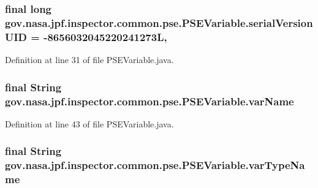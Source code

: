 \subsubsection[{\texorpdfstring{serial\+Version\+U\+ID}{serialVersionUID}}]{\setlength{\rightskip}{0pt plus 5cm}final long gov.\+nasa.\+jpf.\+inspector.\+common.\+pse.\+P\+S\+E\+Variable.\+serial\+Version\+U\+ID = -\/8656032045220241273L\hspace{0.3cm}{\ttfamily [static]}, {\ttfamily [private]}}\hypertarget{classgov_1_1nasa_1_1jpf_1_1inspector_1_1common_1_1pse_1_1_p_s_e_variable_ad11aee75ecf196e7e13bf14e3f9287d4}{}\label{classgov_1_1nasa_1_1jpf_1_1inspector_1_1common_1_1pse_1_1_p_s_e_variable_ad11aee75ecf196e7e13bf14e3f9287d4}


Definition at line 31 of file P\+S\+E\+Variable.\+java.

\subsubsection[{\texorpdfstring{var\+Name}{varName}}]{\setlength{\rightskip}{0pt plus 5cm}final String gov.\+nasa.\+jpf.\+inspector.\+common.\+pse.\+P\+S\+E\+Variable.\+var\+Name\hspace{0.3cm}{\ttfamily [private]}}\hypertarget{classgov_1_1nasa_1_1jpf_1_1inspector_1_1common_1_1pse_1_1_p_s_e_variable_ab22ccad7c4981bcadd0ddf2df3337689}{}\label{classgov_1_1nasa_1_1jpf_1_1inspector_1_1common_1_1pse_1_1_p_s_e_variable_ab22ccad7c4981bcadd0ddf2df3337689}


Definition at line 43 of file P\+S\+E\+Variable.\+java.

\subsubsection[{\texorpdfstring{var\+Type\+Name}{varTypeName}}]{\setlength{\rightskip}{0pt plus 5cm}final String gov.\+nasa.\+jpf.\+inspector.\+common.\+pse.\+P\+S\+E\+Variable.\+var\+Type\+Name\hspace{0.3cm}{\ttfamily [private]}}\hypertarget{classgov_1_1nasa_1_1jpf_1_1inspector_1_1common_1_1pse_1_1_p_s_e_variable_a646062a613747f6813b99f010f361222}{}\label{classgov_1_1nasa_1_1jpf_1_1inspector_1_1common_1_1pse_1_1_p_s_e_variable_a646062a613747f6813b99f010f361222}


